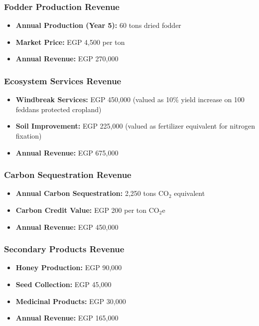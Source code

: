 \subsubsection{Fodder Production Revenue}
\begin{itemize}
    \item \textbf{Annual Production (Year 5):} 60 tons dried fodder
    \item \textbf{Market Price:} EGP 4,500 per ton
    \item \textbf{Annual Revenue:} EGP 270,000
\end{itemize}

\subsubsection{Ecosystem Services Revenue}
\begin{itemize}
    \item \textbf{Windbreak Services:} EGP 450,000 (valued as 10\% yield increase on 100 feddans protected cropland)
    \item \textbf{Soil Improvement:} EGP 225,000 (valued as fertilizer equivalent for nitrogen fixation)
    \item \textbf{Annual Revenue:} EGP 675,000
\end{itemize}

\subsubsection{Carbon Sequestration Revenue}
\begin{itemize}
    \item \textbf{Annual Carbon Sequestration:} 2,250 tons CO$_2$ equivalent
    \item \textbf{Carbon Credit Value:} EGP 200 per ton CO$_2$e
    \item \textbf{Annual Revenue:} EGP 450,000
\end{itemize}

\subsubsection{Secondary Products Revenue}
\begin{itemize}
    \item \textbf{Honey Production:} EGP 90,000
    \item \textbf{Seed Collection:} EGP 45,000
    \item \textbf{Medicinal Products:} EGP 30,000
    \item \textbf{Annual Revenue:} EGP 165,000
\end{itemize}

